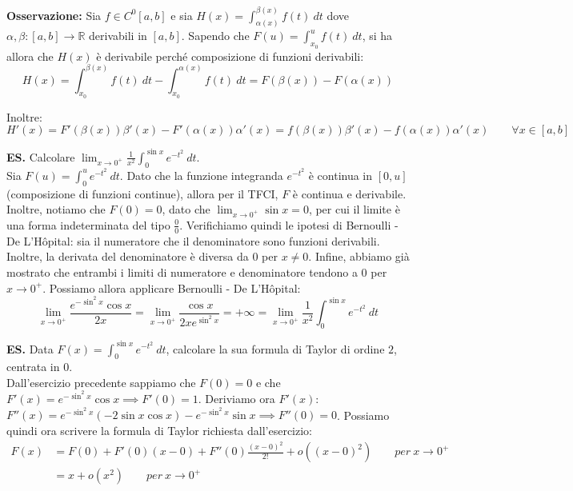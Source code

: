 \documentclass{article}
\begin{document}
\noindent\textbf{Osservazione:} Sia $f \in C^0[a, b]$ e sia $H(x) = \int_{\alpha(x)}^{\beta(x)} f(t) \ dt$ dove $\alpha, \beta: [a, b] \xrightarrow{} \mathbb{R}$ derivabili in $[a, b]$. Sapendo che $F(u) = \int_{x_0}^u f(t) \ dt$, si ha allora che $H(x)$ è derivabile perché composizione di funzioni derivabili:
\begin{equation*}
    H(x) = \int_{x_0}^{\beta(x)} f(t) \ dt - \int_{x_0}^{\alpha(x)} f(t) \ dt = F(\beta(x)) - F(\alpha(x))
\end{equation*}

\noindent Inoltre: 
\begin{equation*}
    H'(x) = F'(\beta(x))\beta'(x) - F'(\alpha(x))\alpha'(x) = f(\beta(x))\beta'(x) - f(\alpha(x))\alpha'(x) \qquad \forall x \in [a, b]
\end{equation*}

\noindent\textbf{ES.} Calcolare $\lim_{x \to 0^+} \frac{1}{x^2} \int_0^{\sin x} e^{-t^2} \ dt$.\\
Sia $F(u) = \int_0^u e^{-t^2} \ dt$. Dato che la funzione integranda $e^{-t^2}$ è continua in $[0, u]$ (composizione di funzioni continue), allora per il TFCI, $F$ è continua e derivabile. Inoltre, notiamo che $F(0) = 0$, dato che $\lim_{x \to 0^+} \sin x = 0$, per cui il limite è una forma indeterminata del tipo $\frac{0}{0}$. Verifichiamo quindi le ipotesi di Bernoulli - De L'Hôpital: sia il numeratore che il denominatore sono funzioni derivabili. Inoltre, la derivata del denominatore è diversa da $0$ per $x \neq 0$. Infine, abbiamo già mostrato che entrambi i limiti di numeratore e denominatore tendono a $0$ per $x \to 0^+$. Possiamo allora applicare Bernoulli - De L'Hôpital:
\begin{equation*}
    \lim_{x \to 0^+} \frac{e^{-\sin^2x}\cos x}{2x} = \lim_{x \to 0^+} \frac{\cos x}{2xe^{\sin^2x}} = +\infty = \lim_{x \to 0^+} \frac{1}{x^2} \int_0^{\sin x} e^{-t^2} \ dt
\end{equation*}

\noindent\textbf{ES.} Data $F(x) = \int_0^{\sin x} e^{-t^2} \ dt$, calcolare la sua formula di Taylor di ordine $2$, centrata in $0$.\\
Dall'esercizio precedente sappiamo che $F(0) = 0$ e che $F'(x) = e^{-\sin^2x} \cos x \implies F'(0) = 1$. Deriviamo ora $F'(x)$: $F''(x) = e^{-\sin^2x} (-2\sin x\cos x) - e^{-\sin^2 x} \sin x \implies F''(0) = 0$. Possiamo quindi ora scrivere la formula di Taylor richiesta dall'esercizio:
\begin{align*}
    F(x) &= F(0) + F'(0)(x - 0) + F''(0) \frac{(x - 0)^2}{2!} + o((x - 0)^2) \qquad per \ x \to 0^+ \\
    &= x + o(x^2) \qquad per \ x \to 0^+
\end{align*}
\end{document}
